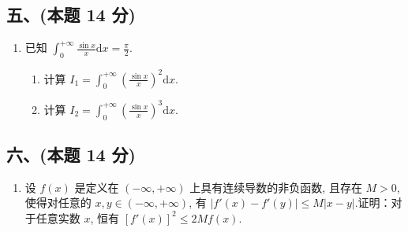 \subsection*{五、(本题 14 分)}
\begin{enumerate}[start=9]
    \item 已知 $\displaystyle\int_{0}^{+\infty} \frac{\sin x}{x} \mathrm{d}x = \frac{\pi}{2}$.
          \begin{enumerate}
              \item[(1)] 计算 $I_1 = \displaystyle\int_{0}^{+\infty} \left(\frac{\sin x}{x}\right)^2 \mathrm{d}x$.
              \item[(2)] 计算 $I_2 = \displaystyle\int_{0}^{+\infty} \left(\frac{\sin x}{x}\right)^3 \mathrm{d}x$.
          \end{enumerate}
\end{enumerate}

\subsection*{六、(本题 14 分)}
\begin{enumerate}[start=10]
    \item 设 $f(x)$ 是定义在 $(-\infty, +\infty)$ 上具有连续导数的非负函数, 且存在 $M > 0$, 使得对任意的 $x, y \in (-\infty, +\infty)$, 有 $|f'(x) - f'(y)| \leqslant M |x - y|$.证明：对于任意实数 $x$, 恒有 $[f'(x)]^2 \leqslant 2Mf(x)$.
\end{enumerate}

